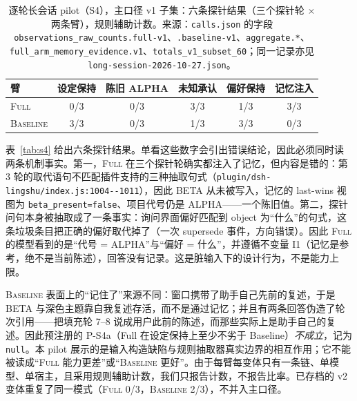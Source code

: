 \begin{table}[t]
\centering\footnotesize
\caption{逐轮长会话 pilot（S4），主口径 v1 子集：六条探针结果（三个探针轮 $\times$ 两条臂），规则辅助计数。来源：\texttt{calls.json} 的字段 \texttt{observations\_\allowbreak{}raw\_\allowbreak{}counts.\allowbreak{}full-\allowbreak{}v1}、\texttt{.baseline-v1}、\texttt{aggregate.*}、\texttt{full\_\allowbreak{}arm\_\allowbreak{}memory\_\allowbreak{}evidence.\allowbreak{}v1}、\texttt{totals\_\allowbreak{}v1\_\allowbreak{}subset\_\allowbreak{}60}；同一记录亦见 \texttt{long-\allowbreak{}session-\allowbreak{}2026-\allowbreak{}10-\allowbreak{}27.\allowbreak{}json}。}
\begin{tabular}{@{}l ccccc@{}}
\toprule
臂 & 设定保持 & 陈旧 ALPHA & 未知承认 & 偏好保持 & 记忆注入 \\
\midrule
\textsc{Full} & 0/3 & 0/3 & 3/3 & 1/3 & 3/3 \\
\textsc{Baseline} & 3/3 & 0/3 & 1/3 & 3/3 & 0/3 \\
\bottomrule
\end{tabular}
\end{table}

表~\ref{tab:s4} 给出六条探针结果。单看这些数字会引出错误结论，因此必须同时读两条机制事实。第一，\textsc{Full} 在三个探针轮确实都注入了记忆，但内容是错的：第 3 轮的取代语句不匹配插件支持的三种抽取句式（\texttt{plugin/\allowbreak{}dsh-\allowbreak{}lingshu/\allowbreak{}index.\allowbreak{}js:\allowbreak{}1004-\allowbreak{}-\allowbreak{}1011}），因此 BETA 从未被写入，记忆的 last-wins 视图为 \texttt{beta\_\allowbreak{}present=false}、项目代号仍是 ALPHA——一个陈旧值。第二，探针问句本身被抽取成了一条事实：询问界面偏好匹配到 object 为“什么”的句式，这条垃圾条目把正确的偏好取代掉了（一次 supersede 事件，方向错误）。因此 \textsc{Full} 的模型看到的是“代号 = ALPHA”与“偏好 = 什么”，并遵循不变量 I1（记忆是参考，绝不是当前陈述），回答没有记录。这是脏输入下的设计行为，不是能力上限。

\textsc{Baseline} 表面上的“记住了”来源不同：窗口携带了助手自己先前的复述，于是 BETA 与深色主题靠自我复述存活，而不是通过记忆；并且有两条回答伪造了轮次引用——把填充轮 7--8 说成用户此前的陈述，而那些实际上是助手自己的复述。因此预注册的 P-S4a（Full 在设定保持上至少不劣于 Baseline）\emph{不成立}，记为 \texttt{null}。本 pilot 展示的是输入构造缺陷与规则抽取器真实边界的相互作用；它不能被读成“\textsc{Full} 能力更差”或“\textsc{Baseline} 更好”。由于每臂每变体只有一条链、单模型、单宿主，且采用规则辅助计数，我们只报告计数，不报告比率。已存档的 v2 变体重复了同一模式（\textsc{Full} 0/3，\textsc{Baseline} 2/3），不并入主口径。
